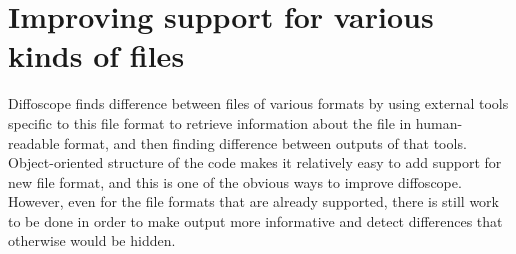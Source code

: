 \section{Improving support for various kinds of files}

Diffoscope finds difference between files of various formats by using external
tools specific to this file format to retrieve information about the file in
human-readable format, and then finding difference between outputs of that tools.
Object-oriented structure of the code makes it relatively easy to add support for 
new file format, and this is one of the obvious ways to improve diffoscope.\\
However, even for the file formats that are already supported, there is still work 
to be done in order to make output more informative and detect differences that
otherwise would be hidden.\\

